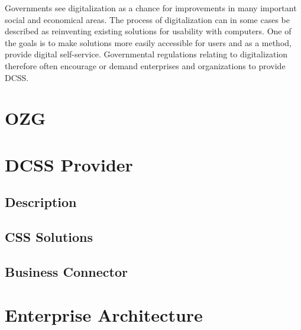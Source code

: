 \documentclass[
     12pt,         %
     a4paper,      %
     BCOR10mm,     %
     DIV14,        %
aragraph skip instad of paragraph indent
     ]{scrreprt}
\begin{document}
Governments see digitalization as a chance for improvements in many important social and economical areas. The process of digitalization can in
some cases be described as reinventing existing solutions for usability with computers. One of the goals is to make solutions more easily accessible for users and as a 
method, provide digital self-service. Governmental regulations relating to digitalization therefore often encourage or demand enterprises and organizations to 
provide DCSS.

\section{OZG}




\section{DCSS Provider}


\subsection{Description}

\subsection{CSS Solutions}

\subsection{Business Connector}

\section{Enterprise Architecture}

\end{document}
